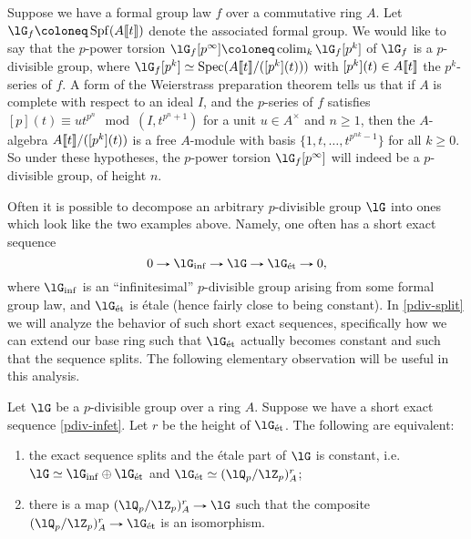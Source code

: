 \begin{example}
  \label{pdiv-formal}
  Suppose we have a formal group law $f$ over a commutative ring $A$.
  Let $\lG_f \ce \Spf(A \ldb t \rdb)$ denote the associated formal
  group. We would like to say that the $p$-power torsion
  $\lG_f[p^\infty] \ce \colim_k \lG_f[p^k]$ of $\lG_f$ is a
  $p$-divisible group, where
  $\lG_f[p^k] \iso \Spec(A \ldb t \rdb / ([p^k](t)))$ with
  $[p^k](t) \in A \llbracket t \rrbracket$ the $p^k$-series of $f$. A form of the
  Weierstrass preparation theorem \cite[5.1--5.2]{hkr-char} tells us
  that if $A$ is complete with respect to an ideal $I$, and the
  $p$-series of $f$ satisfies
  $[p](t) \equiv ut^{p^n} \mod (I, t^{p^n+1})$ for a unit
  $u \in A^\times$ and $n \ge 1$, then the $A$-algebra
  $A \llbracket t \rrbracket / ([p^k](t))$ is a free $A$-module with basis
  $\{1, t, \ldots, t^{p^{nk} -1}\}$ for all $k \ge 0$. So under these
  hypotheses, the $p$-power torsion $\lG_f[p^\infty]$ will indeed be a
  $p$-divisible group, of height $n$.
\end{example}

Often it is possible to decompose an arbitrary $p$-divisible group
$\lG$ into ones which look like the two examples above. Namely, one
often has a short exact sequence
\begin{equation}
  \label{pdiv-infet}
  0 \to \lG_\inf \to \lG \to \lG_\et \to 0,
\end{equation}
where $\lG_\inf$ is an ``infinitesimal'' $p$-divisible group arising
from some formal group law, and $\lG_\et$ is \'etale (hence fairly
close to being constant). In \cref{pdiv-split} we will analyze the
behavior of such short exact sequences, specifically how we can extend
our base ring such that $\lG_\et$ actually becomes constant and such
that the sequence splits. The following elementary observation will be
useful in this analysis.

\begin{proposition}
  \label{pdiv-infet-split}
  Let $\lG$ be a $p$-divisible group over a ring $A$. Suppose we have
  a short exact sequence \cref{pdiv-infet}. Let $r$ be the height of
  $\lG_\et$. The following are equivalent:
  \begin{enumerate}
  \item \label{pdiv-infet-split-yeah} the exact sequence splits and
    the \'etale part of $\lG$ is constant, i.e.
    $\lG \iso \lG_\inf \oplus \lG_\et$ and
    $\lG_\et \iso (\lQ_p/\lZ_p)^r_A$;
  \item \label{pdiv-infet-split-map} there is a map
    $(\lQ_p/\lZ_p)^r_A \to \lG$ such that the composite
    $(\lQ_p/\lZ_p)^r_A \to \lG_\et$ is an isomorphism.
  \end{enumerate}
\end{proposition}


